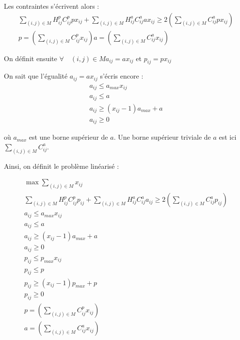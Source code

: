 \documentclass[a4paper,11pt] {article}
\begin{document}
Les contraintes s'écrivent alors : 
\begin{equation}
\begin{array}{l}
\sum\limits_{(i,j)\in M} H^p_{ij}C^p_{ij}px_{ij} + \sum\limits_{(i,j)\in M} H^a_{ij}C^a_{ij}ax_{ij} \geq 2(\sum\limits_{(i,j)\in M} C^a_{ij}px_{ij})\\
p = (\sum\limits_{(i,j)\in M} C^p_{ij}x_{ij})
a = (\sum\limits_{(i,j)\in M} C^a_{ij}x_{ij})
\end{array}
\end{equation}

On définit ensuite $\forall\quad (i,j)\in M a_{ij}=ax_{ij}$ et $p_{ij}=px_{ij}$

On sait que l'égualité $a_{ij}=ax_{ij}$ s'écris encore : 
\begin{equation}
\begin{array}{l}
a_{ij}\leq a_{max}x_{ij}\\
a_{ij}\leq a\\
a_{ij}\geq (x_{ij}-1)a_{max}+a\\
a_{ij} \geq 0
\end{array}
\end{equation}

où $a_{max}$ est une borne supérieur de $a$. Une borne supérieur triviale de $a$ est ici $\sum\limits_{(i,j)\in M} C^a_{ij}$.

Ainsi, on définit le problème linéarisé : 

\begin{equation}
\begin{array}{l}
\max \sum\limits_{(i,j)\in M} x_{ij}\\
\sum\limits_{(i,j)\in M} H^p_{ij}C^p_{ij}p_{ij} + \sum\limits_{(i,j)\in M} H^a_{ij}C^a_{ij}a_{ij} \geq 2(\sum\limits_{(i,j)\in M} C^a_{ij}p_{ij})\\
a_{ij}\leq a_{max}x_{ij}\\
a_{ij}\leq a\\
a_{ij}\geq (x_{ij}-1)a_{max}+a\\
a_{ij} \geq 0\\
p_{ij}\leq p_{max}x_{ij}\\
p_{ij}\leq p\\
p_{ij}\geq (x_{ij}-1)p_{max}+p\\
p_{ij} \geq 0\\
p = (\sum\limits_{(i,j)\in M} C^p_{ij}x_{ij})\\
a = (\sum\limits_{(i,j)\in M} C^a_{ij}x_{ij})
\end{array}
\end{equation}
\end{document}
